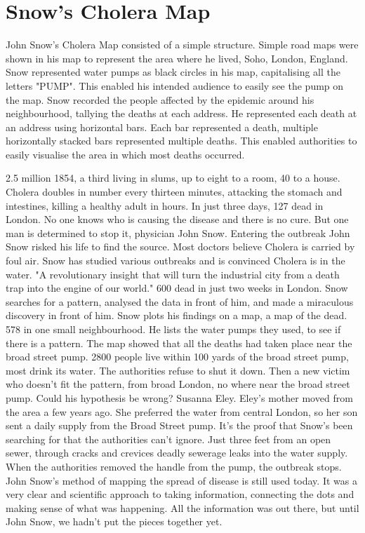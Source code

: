 \documentclass[12pt]{article}
\begin{document}
\section{Snow's Cholera Map}

John Snow's Cholera Map consisted of a simple structure. Simple road maps were shown in his map to represent the area where he lived, Soho, London, England. Snow represented water pumps as black circles in his map, capitalising all the letters "PUMP". This enabled his intended audience to easily see the pump on the map. Snow recorded the people affected by the epidemic around his neighbourhood, tallying the deaths at each address. He represented each death at an address using horizontal bars. Each bar represented a death, multiple horizontally stacked bars represented multiple deaths. This enabled authorities to easily visualise the area in which most deaths occurred.  


2.5 million 1854, a third living in slums, up to eight to a room, 40 to a house. 
Cholera doubles in number every thirteen minutes, attacking the stomach and intestines, killing a healthy adult in hours. In just three days, 127 dead in London. No one knows who is causing the disease and there is no cure. But one man is determined to stop it, physician John Snow. Entering the outbreak John Snow risked his life to find the source. Most doctors believe Cholera is carried by foul air. Snow has studied various outbreaks and is convinced Cholera is in the water. "A revolutionary insight that will turn the industrial city from a death trap into the engine of our world." 600 dead in just two weeks in London. Snow searches for a pattern, analysed the data in front of him, and made a miraculous discovery in front of him. Snow plots his findings on a map, a map of the dead. 578 in one small neighbourhood. He lists the water pumps they used, to see if there is a pattern. The map showed that all the deaths had taken place near the broad street pump. 2800 people live within 100 yards of the broad street pump, most drink its water. The authorities refuse to shut it down. Then a new victim who doesn't fit the pattern, from broad London, no where near the broad street pump. Could his hypothesis be wrong? Susanna Eley. Eley's mother moved from the area a few years ago. She preferred the water from central London, so her son sent a daily supply from the Broad Street pump. It's the proof that Snow's been searching for that the authorities can't ignore. Just three feet from an open sewer, through cracks and crevices deadly sewerage leaks into the water supply. When the authorities removed the handle from the pump, the outbreak stops. John Snow's method of mapping the spread of disease is still used today. It was a very clear and scientific approach to taking information, connecting the dots and making sense of what was happening. All the information was out there, but until John Snow, we hadn't put the pieces together yet. \cite{channel1}
\end{document}
